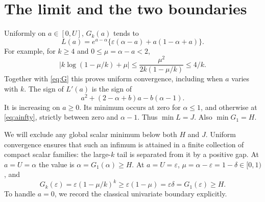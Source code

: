 \documentclass[11pt]{article}
\newcommand{\eps}{\varepsilon}
\begin{document}
\section{The limit and the two boundaries}
Uniformly on $a\in[0,U]$, $G_k(a)$ tends to
\begin{equation}\label{eq:L}
 L(a)=e^{a-\alpha}\{\eps(\alpha-a)+a(1-\alpha+a)\}.
\end{equation}
For example, for $k\ge4$ and $0\le\mu=\alpha-a<2$,
\[
 |k\log(1-\mu/k)+\mu|\le
 \frac{\mu^2}{2k(1-\mu/k)}\le4/k.
\]
Together with \eqref{eq:G} this proves uniform convergence, including
when $a$ varies with $k$. The sign of $L'(a)$ is the sign of
\[
 a^2+(2-\alpha+b)a-b(\alpha-1).
\]
It is increasing on $a\ge0$. Its minimum occurs at zero for
$\alpha\le1$, and otherwise at \eqref{eq:ainfty}, strictly between
zero and $\alpha-1$. Thus $\min L=J$. Also $\min G_1=H$.

We will exclude any global scalar minimum below both $H$ and $J$.
Uniform convergence ensures that such an infimum is attained in a
finite collection of compact scalar families: the large-$k$ tail is
separated from it by a positive gap.
At $a=U=\alpha$ the value is $\alpha=G_1(\alpha)\ge H$.
At $a=U=\eps$, $\mu=\alpha-\eps=1-\delta\in[0,1)$, and
\[
 G_k(\eps)=\eps(1-\mu/k)^k\ge\eps(1-\mu)
 =\eps\delta=G_1(\eps)\ge H.
\]
To handle $a=0$, we record the classical univariate boundary explicitly.
\end{document}
